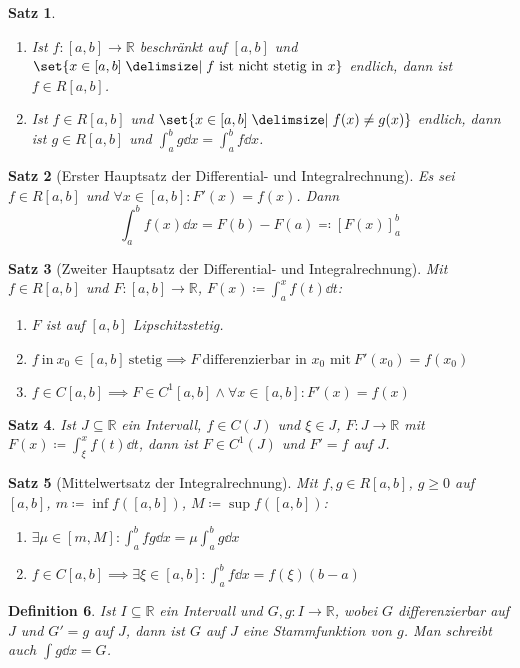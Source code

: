 \documentclass[a4paper]{article}
\newcounter{Sec}
\theoremstyle{marginbreak}
\newtheorem{definition}{Definition}[Sec]
\newtheorem{satz}[definition]{Satz}
\renewcommand{\d}{\dd}
\begin{document}
	\begin{satz}
		\begin{enumerate}[label=(\alph*)]
			\item Ist $f\colon[a,b]\to\mathbb{R}$ beschränkt auf $[a,b]$ und
				$\set{x\in[a,b]\given f~\text{ist nicht stetig in}~x}$ endlich,
				dann ist $f\in R[a,b]$.
			\item Ist $f\in R[a,b]$ und $\set{x\in[a,b]\given f(x)\neq g(x)}$ endlich,
			dann ist $g\in R[a,b]$ und $\int_a^bg\d{x}=\int_a^bf\d{x}$.
		\end{enumerate}
	\end{satz}
	\begin{satz}[Erster Hauptsatz der Differential- und Integralrechnung]
		Es sei $f\in R[a,b]$ und $\forall x\in [a,b]:F'(x)=f(x)$. Dann
		\[ \int_a^bf(x)\d{x}=F(b)-F(a)\eqqcolon [F(x)]_a^b \]
	\end{satz}
	\begin{satz}[Zweiter Hauptsatz der Differential- und Integralrechnung]
		Mit $f\in R[a,b]$ und $F\colon[a,b]\to\mathbb{R}$, $F(x)\coloneqq\int_a^xf(t)\d{t}$:
		\begin{enumerate}[label=(\alph*)]
			\item $F$ ist auf $[a,b]$ Lipschitzstetig.
			\item $f~\text{in}~x_0\in[a,b]~\text{stetig}\implies F~\text{differenzierbar in $x_0$ mit}~F'(x_0)=f(x_0)$
			\item $f\in C[a,b]\implies F\in C^1[a,b]\wedge\forall x\in[a,b]:F'(x)=f(x)$
		\end{enumerate}
	\end{satz}
	\begin{satz}
		Ist $J\subseteq\mathbb{R}$ ein Intervall, $f\in C(J)$ und $\xi\in J$,
		$F\colon J\to\mathbb{R}$ mit $F(x)\coloneqq\int_\xi^xf(t)\d{t}$, dann ist
		$F\in C^1(J)$ und $F'=f$ auf $J$.
	\end{satz}
	\begin{satz}[Mittelwertsatz der Integralrechnung]
		Mit $f,g\in R[a,b]$, $g\geq0$ auf $[a,b]$, $m\coloneqq\inf f([a,b])$,
		$M\coloneqq\sup f([a,b])$:
		\begin{enumerate}[label=(\alph*)]
			\item $\exists\mu\in[m,M]:\int_a^bfg\d{x}=\mu\int_a^bg\d{x}$
			\item $f\in C[a,b]\implies\exists\xi\in[a,b]:\int_a^bf\d{x}=f(\xi)(b-a)$
		\end{enumerate}
	\end{satz}
	\begin{definition}
		Ist $I\subseteq\mathbb{R}$ ein Intervall und $G,g\colon I\to\mathbb{R}$, wobei
		$G$ differenzierbar auf $J$ und $G'=g$ auf $J$, dann ist $G$ auf $J$ eine
		Stammfunktion von $g$. Man schreibt auch $\int g\d{x}=G$.
	\end{definition}
\end{document}
